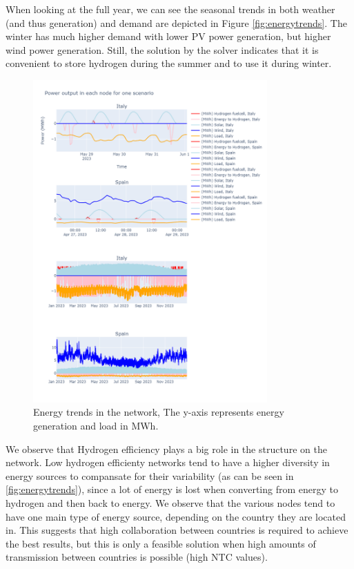 \documentclass[english]{article}
\numberwithin{definition}{section}
\numberwithin{theorem}{section}
\numberwithin{problem}{section}
\begin{document}
When looking at the full year, we can see the seasonal trends in both weather (and thus generation) and demand are depicted in Figure \ref{fig:energytrends}. The winter has much higher demand with lower PV power generation, but higher wind power generation. Still, the solution by the solver indicates that it is convenient to store hydrogen during the summer and to use it during winter.\\


\begin{figure}[H]
  \centering
  \includegraphics[width=0.80\textwidth]{immagini/ImmaginiOptimization/image1.png}
  \caption{Energy trends in the network, The y-axis represents energy generation and load in MWh.}
  \label{fig:higheffenergytrends}
\end{figure}
We observe that Hydrogen efficiency plays a big role in the structure on the network. Low hydrogen efficienty networks tend to have a higher diversity in energy sources to compansate for their variability (as can be seen in \ref{fig:energytrends}), since a lot of energy is lost when converting from energy to hydrogen and then back to energy. We observe that the various nodes tend to have one main type of energy source, depending on the country they are located in. This suggests that high collaboration between countries is required to achieve the best results, but this is only a feasible solution when high amounts of transmission between countries is possible (high NTC values).
\end{document}

